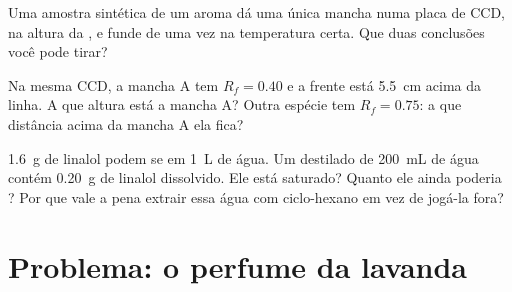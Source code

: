 \begin{exercise}[$\star\star\star$]\label{exo:g10:chemical-species:13}
Uma amostra sintética de um aroma dá uma única mancha numa placa de CCD,
na altura da , e funde de uma vez na temperatura certa.
Que duas conclusões você pode tirar?
\end{exercise}

\begin{exercise}[$\star\star\star$]\label{exo:g10:chemical-species:14}
Na mesma CCD, a mancha A tem $R_f = 0.40$ e a frente está \qty{5.5}{cm}
acima da linha. A que altura está a mancha A? Outra espécie tem
$R_f = 0.75$: a que distância acima da mancha A ela fica?
\end{exercise}

\begin{exercise}[$\star\star\star$]\label{exo:g10:chemical-species:15}
\qty{1.6}{g} de linalol podem se  em \qty{1}{L} de água. Um
destilado de \qty{200}{mL} de água contém \qty{0.20}{g} de linalol
dissolvido. Ele está saturado? Quanto ele ainda poderia ? Por
que vale a pena extrair essa água com ciclo-hexano em vez de jogá-la
fora?
\end{exercise}

\clearpage %
\section{Problema: o perfume da lavanda}

